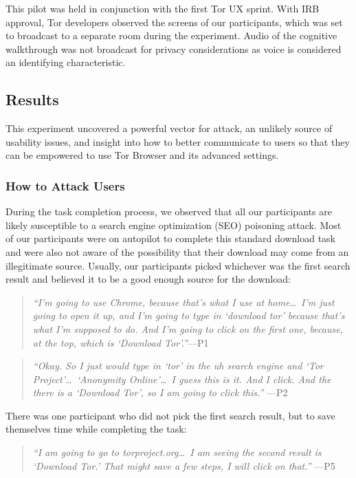 \documentclass[letterpaper,twocolumn,11pt]{article}
\begin{document}
This pilot was held in conjunction with the first Tor UX sprint. With IRB approval, Tor developers
observed the screens of our participants, which was set to broadcast to a separate  
room during the experiment. Audio of the cognitive walkthrough was not broadcast for privacy
considerations as voice is considered an identifying characteristic.

\subsection{Results}
\indent \indent This experiment uncovered a powerful vector for attack, an unlikely source
of usability issues, and insight into how to better communicate to users so that they can be 
empowered to use Tor Browser and its advanced settings. 

\subsubsection{How to Attack Users}
During the task completion process, we observed that all our participants are likely 
susceptible to a search engine optimization (SEO) poisoning attack. Most of our 
participants  were on autopilot to complete this standard download task and 
were also not aware of the possibility that their download may come from an 
illegitimate source. Usually, our participants picked whichever was the first search
result and believed it to be a good enough source for the download: 

\begin{quote}{\it
``I'm going to use Chrome, because that's what I use at home\ldots\ 
I'm just going to open it up, and I'm going to type in `download tor' because 
that's what I'm supposed to do. And I'm going to click on the first one, because,
at the top, which is `Download Tor'.''}\mbox{---P1}
\end{quote}

\begin{quote}{\it
``Okay. So I just would type in `tor' in the uh search engine and `Tor Project'\ldots\ 
`Anonymity Online'\ldots\ I guess this is it. And I click. And the there is a `Download Tor', 
so I am going to click this.''} \mbox{---P2}
\end{quote}

There was one participant who did not pick the first search result, but to save themselves
time while completing the task: 

\begin{quote}{\it
``I am going to go to torproject.org\ldots\ I am seeing the second result is `Download Tor.'
That might save a few steps, I will click on that.''} \mbox{---P5}
\end{quote}
\end{document}
